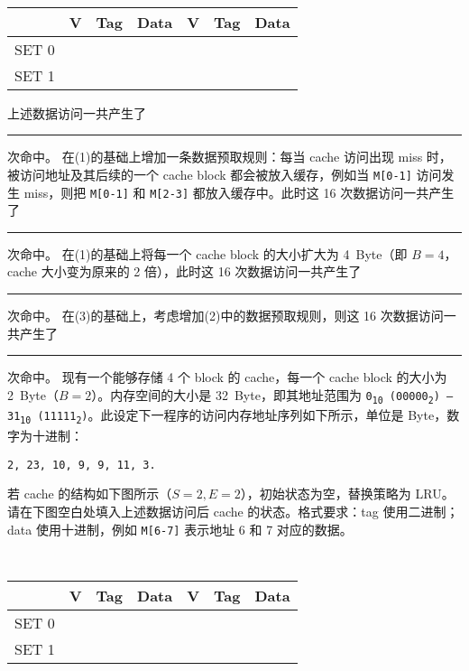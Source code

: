 \begin{problems}
\begin{table}[H]
            \tt
            \centering
            \begin{tabular}{|c|c|c|c|c|c|c|}
                \hline
                & {\quad V \quad} & {\quad Tag \quad} & {\quad Data \quad} & {\quad V \quad} & {\quad Tag \quad} & {\quad Data \quad} \\ \hline
                SET 0 &  &  &  &  &  &  \\ \hline
                SET 1 &  &  &  &  &  &  \\ \hline
            \end{tabular}
        \end{table}
        上述数据访问一共产生了 \rule{2.5cm}{0.25mm} 次命中。
        \qn 在(1)的基础上增加一条数据预取规则：每当 cache 访问出现 miss 时，被访问地址及其后续的一个 cache block 都会被放入缓存，例如当 \verb|M[0-1]| 访问发生 miss，则把 \verb|M[0-1]| 和 \verb|M[2-3]| 都放入缓存中。此时这 16 次数据访问一共产生了 \rule{2.5cm}{0.25mm} 次命中。
        \qn 在(1)的基础上将每一个 cache block 的大小扩大为 \SI{4}{Byte}（即 $B=4$，cache 大小变为原来的 2 倍），此时这 16 次数据访问一共产生了 \rule{2.5cm}{0.25mm} 次命中。
        \qn 在(3)的基础上，考虑增加(2)中的数据预取规则，则这 16 次数据访问一共产生了 \rule{2.5cm}{0.25mm} 次命中。
         现有一个能够存储 4 个 block 的 cache，每一个 cache block 的大小为 \SI{2}{Byte}（$B=2$）。内存空间的大小是 \SI{32}{Byte}，即其地址范围为 \texttt{0\textsubscript{10} (00000\textsubscript{2}) --- 31\textsubscript{10} (11111\textsubscript{2})}。此设定下一程序的访问内存地址序列如下所示，单位是 Byte，数字为十进制：
        \begin{center}
            \tt 2, 23, 10, 9, 9, 11, 3.
        \end{center}
        \qn 若 cache 的结构如下图所示（$S=2, E=2$），初始状态为空，替换策略为 LRU。请在下图空白处填入上述数据访问后 cache 的状态。格式要求：tag 使用二进制；data 使用十进制，例如 \verb|M[6-7]| 表示地址 6 和 7 对应的数据。
        \begin{table}[H]
            \tt
            \centering
            \begin{tabular}{|c|c|c|c|c|c|c|}
                \hline
                & {\quad V \quad} & {\quad Tag \quad} & {\quad Data \quad} & {\quad V \quad} & {\quad Tag \quad} & {\quad Data \quad} \\ \hline
                SET 0 &  &  &  &  &  &  \\ \hline
                SET 1 &  &  &  &  &  &  \\ \hline
            \end{tabular}

\end{table}
\end{problems}
